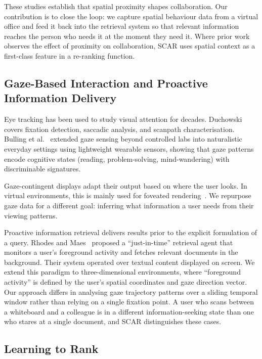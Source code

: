 \documentclass[journal]{IEEEtran}
\begin{document}
These studies establish that spatial proximity shapes collaboration. Our contribution is to close the loop: we capture spatial behaviour data from a virtual office and feed it back into the retrieval system so that relevant information reaches the person who needs it at the moment they need it. Where prior work observes the effect of proximity on collaboration, SCAR uses spatial context as a first-class feature in a re-ranking function.

\subsection{Gaze-Based Interaction and Proactive Information Delivery}

Eye tracking has been used to study visual attention for decades. Duchowski~\cite{Duchowski2017} covers fixation detection, saccadic analysis, and scanpath characterisation. Bulling et al.~\cite{bulling2011eye} extended gaze sensing beyond controlled labs into naturalistic everyday settings using lightweight wearable sensors, showing that gaze patterns encode cognitive states (reading, problem-solving, mind-wandering) with discriminable signatures.

Gaze-contingent displays adapt their output based on where the user looks. In virtual environments, this is mainly used for foveated rendering~\cite{patney2016towards}. We repurpose gaze data for a different goal: inferring what information a user needs from their viewing patterns.

Proactive information retrieval delivers results prior to the explicit formulation of a query. Rhodes and Maes~\cite{rhodes2000just} proposed a ``just-in-time'' retrieval agent that monitors a user's foreground activity and fetches relevant documents in the background. Their system operated over textual content displayed on screen. We extend this paradigm to three-dimensional environments, where ``foreground activity'' is defined by the user's spatial coordinates and gaze direction vector. Our approach differs in analysing gaze trajectory patterns over a sliding temporal window rather than relying on a single fixation point. A user who scans between a whiteboard and a colleague is in a different information-seeking state than one who stares at a single document, and SCAR distinguishes these cases.

\subsection{Learning to Rank}
\end{document}
